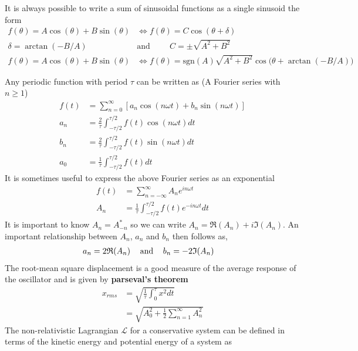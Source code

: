 It is always possible to write a sum of sinusoidal functions as a single sinusoid the form
\begin{align}
f(\theta)=A\cos(\theta)+B\sin(\theta) &\Longleftrightarrow  f(\theta)=C\cos(\theta+\delta) \\
\delta = \arctan(-B/A) \hspace{1cm}&\textrm{and}\hspace{1cm} C = \pm\sqrt{A^2+B^2} \\
f(\theta)=A\cos(\theta)+B\sin(\theta) &\Longleftrightarrow f(\theta)=\textrm{sgn}(A)\sqrt{A^2+B^2}\cos\big(\theta+\arctan(-B/A)\big)
\end{align} 


\begin{multicols}{2}
Any periodic function with period $\tau$ can be written as (A Fourier series with $n \geq 1$)
\begin{align}
f(t)&=\sum_{n=0}^{\infty}[a_n\cos(n\omega t)+b_n\sin(n\omega t)] \\
a_n&= \frac{2}{\tau}\int_{-\tau/2}^{\tau/2}f(t)\cos(n\omega t)dt \\
b_n&= \frac{2}{\tau}\int_{-\tau/2}^{\tau/2}f(t)\sin(n\omega t)dt \\
a_0&= \frac{1}{\tau}\int_{-\tau/2}^{\tau/2}f(t)dt
\end{align}
It is sometimes useful to express the above Fourier series as an exponential
\begin{align}
f(t)&=\sum_{n=-\infty}^{\infty}A_ne^{in\omega t} \\
A_n&=\frac{1}{\tau}\int_{-\tau/2}^{\tau/2}f(t)e^{-in\omega t}dt
\end{align} 
It is important to know $A_n=A^*_{-n}$ so we can write $A_n=\mathfrak{R}(A_n)+i\mathfrak{I}(A_n)$. An important relationship between $A_n$, $a_n$ and $b_n$ then follows as, 
\begin{align}
a_n&=2\mathfrak{R}(A_n)\hspace{0.3cm}\textrm{ and }\hspace{0.3cm} b_n=-2\mathfrak{I}(A_n)
\end{align}
The root-mean square displacement is a good measure of the average response of the oscillator and is given by \textbf{parseval's theorem}
\begin{align}
x_{rms}&=\sqrt{\frac{1}{\tau}\int_{0}^{\tau}x^2dt} \\ &=
\sqrt{A_0^2+\frac{1}{2}\sum_{n=1}^{\infty}A_n^2}
\end{align}
The non-relativistic Lagrangian $\mathcal{L}$ for a conservative system can be defined in terms of the kinetic energy and potential energy of a system as

\end{multicols}
